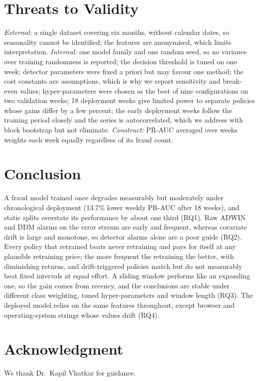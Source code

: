 \documentclass[conference]{IEEEtran}
\begin{document}
\section{Threats to Validity}
\emph{External:} a single dataset covering six months, without calendar dates, so seasonality cannot be identified; the features are anonymised, which limits interpretation. \emph{Internal:} one model family and one random seed, so no variance over training randomness is reported;
the decision threshold is tuned on one week; detector parameters were fixed a priori but may favour one method; the cost constants are assumptions, which is why we report sensitivity and break-even values; hyper-parameters were chosen as the best of nine configurations on two validation weeks; 18 deployment weeks give limited power to separate policies
whose gains differ by a few percent; the early deployment weeks follow the training period closely and the series is autocorrelated, which we address with block bootstrap but not eliminate.
\emph{Construct:} PR-AUC averaged over weeks weights each week equally regardless of its fraud count.

\section{Conclusion}
A fraud model trained once degrades measurably but moderately under chronological deployment (13.7\% lower weekly PR-AUC after 18 weeks), and static splits overstate its performance by about one third (RQ1).
Raw ADWIN and DDM alarms on the error stream are early and frequent, whereas covariate drift is large and monotone, so detector alarms alone are a poor guide (RQ2).
Every policy that retrained beats never retraining and pays for itself at any plausible retraining price; the more frequent the retraining the better, with diminishing returns, and drift-triggered policies match but do not measurably beat fixed intervals at equal effort. A sliding window performs like an expanding one, so the gain comes from recency, and the conclusions are stable under different class weighting, tuned hyper-parameters and window length (RQ3).
The deployed model relies on the same features throughout, except browser and operating-system strings whose values drift (RQ4).

\section*{Acknowledgment}
We thank Dr.~Kapil Vhatkar for guidance.



\end{document}
